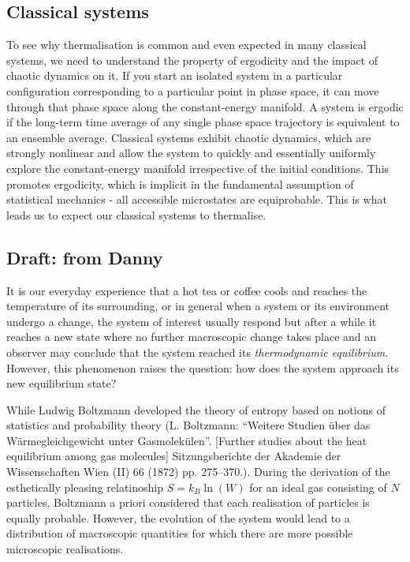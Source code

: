 \documentclass[a4paper, 10pt]{article}
\theoremstyle{plain}
\begin{document}
\subsection{Classical systems}

To see why thermalisation is common and even expected in many classical
systems, we need to understand the property of ergodicity and the impact of
chaotic dynamics on it. If you start an isolated system in a particular
configuration corresponding to a particular point in phase space, it can move
through that phase space along the constant-energy manifold. A system is
ergodic if the long-term time average of any single phase space trajectory
is equivalent to an ensemble average.  Classical systems
exhibit chaotic dynamics, which are strongly nonlinear and allow the system to
quickly and essentially uniformly explore the constant-energy manifold
irrespective of the initial conditions. This promotes ergodicity, which is
implicit in the fundamental assumption of statistical mechanics - all
accessible microstates are equiprobable.  This is what leads us to expect
our classical systems to thermalise.

\subsection{Draft: from Danny}

It is our everyday experience that a hot tea or coffee cools and reaches the
temperature of its surrounding, or in general when a system or its environment
undergo a change, the system of interest usually respond but after a while it
reaches a new state where no further macroscopic change takes place and an
observer may conclude that the system reached its {\emph{thermodynamic
equilibrium}}. However, this phenomenon raises the question: how does the system
approach its new equilibrium state?

While Ludwig Boltzmann developed the theory of entropy based on notions of
statistics and probability theory (L. Boltzmann: ``Weitere Studien über das
Wärmegleichgewicht unter Gasmolekülen''. [Further studies about the heat
equilibrium among gas molecules] Sitzungsberichte der Akademie der
Wissenschaften Wien (II) 66 (1872) pp. 275–370.). During the derivation of the
esthetically pleasing relatinoship $S=k_{B}\ln{\!(W)}$ for an ideal gas
consisting of $N$ particles, Boltzmann a priori considered that each realisation
of particles is equally probable. However, the evolution of the system would
lead to a distribution of macroscopic quantities for which there are more
possible microscopic realisations.
\end{document}

